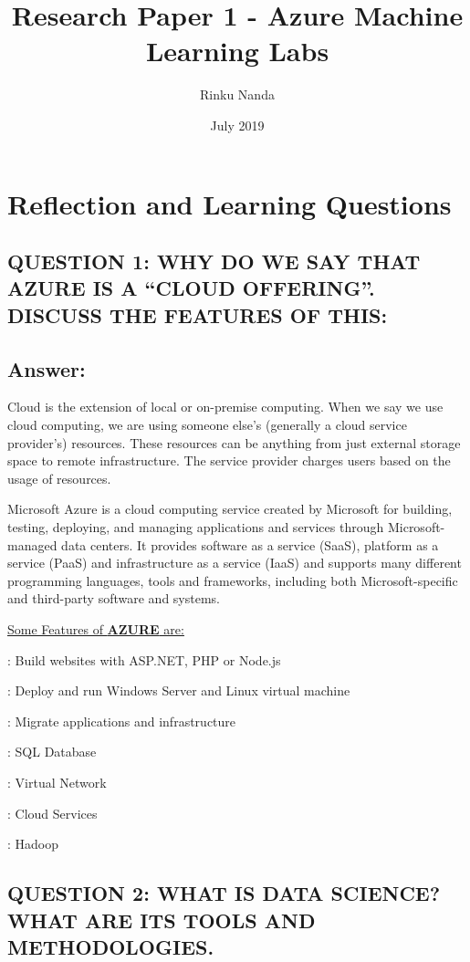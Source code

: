 \documentclass[10 pm]{article}
\title  {Research Paper 1 - Azure Machine Learning Labs }
\author{Rinku Nanda  }
\date{July 2019}
\begin{document}
\maketitle


\section{Reflection and Learning Questions}

\subsection{QUESTION 1: WHY DO WE SAY THAT AZURE IS A “CLOUD OFFERING”. DISCUSS THE FEATURES OF THIS:}

\subsection*{Answer:}
Cloud is the extension of local or on-premise computing. When we say we use cloud computing, we are using someone else’s (generally a cloud service provider’s) resources. These resources can be anything from just external storage space to remote infrastructure. The service provider charges users based on the usage of resources. 

Microsoft Azure is a cloud computing service created by Microsoft for building, testing, deploying, and managing applications and services through Microsoft-managed data centers. It provides software as a service (SaaS), platform as a service (PaaS) and infrastructure as a service (IaaS) and supports many different programming languages, tools and frameworks, including both Microsoft-specific and third-party software and systems. 

\underline{Some Features of \textbf{AZURE} are:} 

 : Build websites with ASP.NET, PHP or Node.js

 : Deploy and run Windows Server and Linux virtual machine

 : Migrate applications and infrastructure

 : SQL Database	

 : Virtual Network

 : Cloud Services

 : Hadoop


\subsection{QUESTION 2: WHAT IS DATA SCIENCE? WHAT ARE ITS TOOLS AND METHODOLOGIES.}
\end{document}
